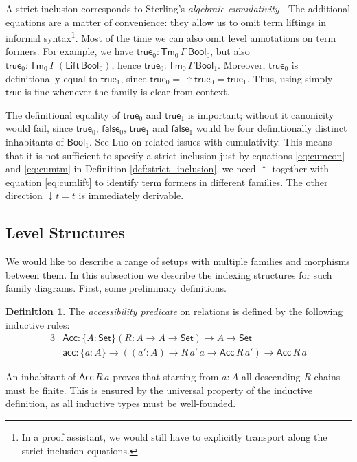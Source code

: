 \documentclass[a4paper,UKenglish,cleveref, autoref, thm-restate]{lipics-v2021}
\theoremstyle{remark}
\theoremstyle{definition}
\newtheorem{mydefinition}{Definition}
\newcommand{\Seti}{\mathsf{Set}}
\newcommand{\Tm}{\mathsf{Tm}}
\newcommand{\mi}[1]{\mathit{#1}}
\newcommand{\Bool}{\mathsf{Bool}}
\newcommand{\true}{\mathsf{true}}
\newcommand{\false}{\mathsf{false}}
\newcommand{\up}{\uparrow}
\newcommand{\down}{\downarrow}
\newcommand{\Lift}{\mathsf{Lift}}
\newcommand{\Acc}{\mathsf{Acc}}
\newcommand{\acc}{\mathsf{acc}}
\begin{document}
A strict inclusion corresponds to Sterling's \emph{algebraic cumulativity}
\cite{sterling2019algebraic}. The additional equations are a matter of convenience: they allow us
to omit term liftings in informal syntax\footnote{In a proof assistant, we would
  still have to explicitly transport along the strict inclusion
  equations.}. Most of the time we can also omit level annotations
on term formers. For example, we have $\true_0 : \Tm_0\,\Gamma\,\Bool_0$,
but also $\true_0 : \Tm_0\,\Gamma\,(\Lift\,\Bool_0)$, hence $\true_0 :
\Tm_0\,\Gamma\,\Bool_1$. Moreover, $\true_0$ is definitionally equal to
$\true_1$, since $\true_0 =\,\up\!\true_0 = \true_1$. Thus, using simply $\true$
is fine whenever the family is clear from context.

The definitional equality of $\true_0$ and $\true_1$ is important; without it
canonicity would fail, since $\true_0$, $\false_0$, $\true_1$ and $\false_1$
would be four definitionally distinct inhabitants of $\Bool_1$. See Luo
\cite{luo2012notes} on related issues with cumulativity. This means that it is
not sufficient to specify a strict inclusion just by equations \ref{eq:cumcon}
and \ref{eq:cumtm} in Definition \ref{def:strict_inclusion}, we need $\up$ together
with equation \ref{eq:cumlift} to identify term formers in different families. The
other direction $\down\!t = t$ is immediately derivable.

\subsection{Level Structures}
\label{sec:level_structures}

We would like to describe a range of setups with multiple families and morphisms
between them. In this subsection we describe the indexing structures for such
family diagrams. First, some preliminary definitions.

\begin{mydefinition} The \emph{accessibility predicate} on relations is defined by the following
inductive rules:
\begin{alignat*}{3}
  & \Acc : \{A : \Seti\}(R : A \to A \to \Seti) \to A \to \Seti \\
  & \acc : \{a : A\} \to ((\mi{a'} : A) \to R\,\mi{a'}\,a \to \Acc\,R\,\mi{a'}) \to \Acc\,R\,a
\end{alignat*}
\end{mydefinition}

\noindent An inhabitant of $\Acc\,R\,a$ proves that starting from $a : A$ all
descending $R$-chains must be finite. This is ensured by the universal property
of the inductive definition, as all inductive types must be well-founded.
\end{document}
